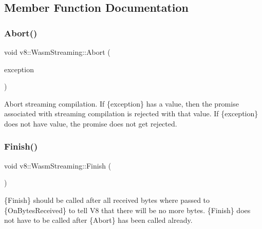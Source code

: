 \subsection{Member Function Documentation}
\mbox{\label{classv8_1_1WasmStreaming_aca7399d97368360079e3030b2fb4fc94}} 
\subsubsection{\texorpdfstring{Abort()}{Abort()}}
{\footnotesize\ttfamily void v8\+::\+Wasm\+Streaming\+::\+Abort (\begin{DoxyParamCaption}\item[{\mbox{\hyperlink{classv8_1_1MaybeLocal}{Maybe\+Local}}$<$ \mbox{\hyperlink{classv8_1_1Value}{Value}} $>$}]{exception }\end{DoxyParamCaption})}

Abort streaming compilation. If \{exception\} has a value, then the promise associated with streaming compilation is rejected with that value. If \{exception\} does not have value, the promise does not get rejected. \mbox{\label{classv8_1_1WasmStreaming_a2c40c85c34643af871577ea98d792de6}} 
\subsubsection{\texorpdfstring{Finish()}{Finish()}}
{\footnotesize\ttfamily void v8\+::\+Wasm\+Streaming\+::\+Finish (\begin{DoxyParamCaption}{ }\end{DoxyParamCaption})}

\{Finish\} should be called after all received bytes where passed to \{On\+Bytes\+Received\} to tell V8 that there will be no more bytes. \{Finish\} does not have to be called after \{Abort\} has been called already. \mbox{\label{classv8_1_1WasmStreaming_ada886a06f191ac65897763bda60c2f54}} 
